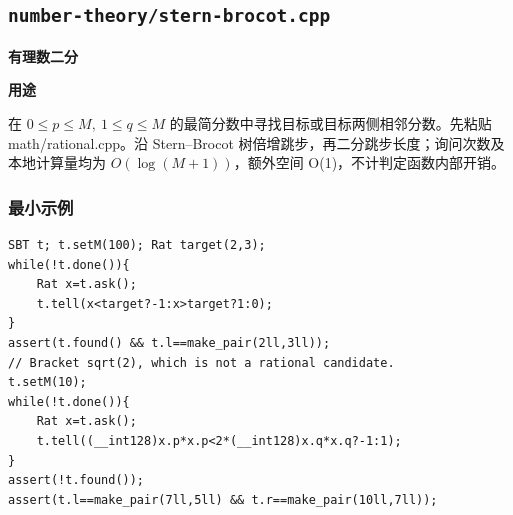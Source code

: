 \documentclass[UTF8,a4paper,10pt]{ctexart}
\newcommand{\TemplUsage}[1]{\textbf{用途}\par #1\par}
\begin{document}
\subsection{\texttt{number-theory/stern-brocot.cpp}}
\textbf{有理数二分}\par
\TemplUsage{在 $0\le p\le M,\ 1\le q\le M$ 的最简分数中寻找目标或目标两侧相邻分数。先粘贴 math/rational.cpp。沿 Stern--Brocot 树倍增跳步，再二分跳步长度；询问次数及本地计算量均为 $O(\log(M+1))$，额外空间 O(1)，不计判定函数内部开销。}
\subsubsection*{最小示例}
\begin{lstlisting}
SBT t; t.setM(100); Rat target(2,3);
while(!t.done()){
    Rat x=t.ask();
    t.tell(x<target?-1:x>target?1:0);
}
assert(t.found() && t.l==make_pair(2ll,3ll));
// Bracket sqrt(2), which is not a rational candidate.
t.setM(10);
while(!t.done()){
    Rat x=t.ask();
    t.tell((__int128)x.p*x.p<2*(__int128)x.q*x.q?-1:1);
}
assert(!t.found());
assert(t.l==make_pair(7ll,5ll) && t.r==make_pair(10ll,7ll));
\end{lstlisting}
\end{document}
